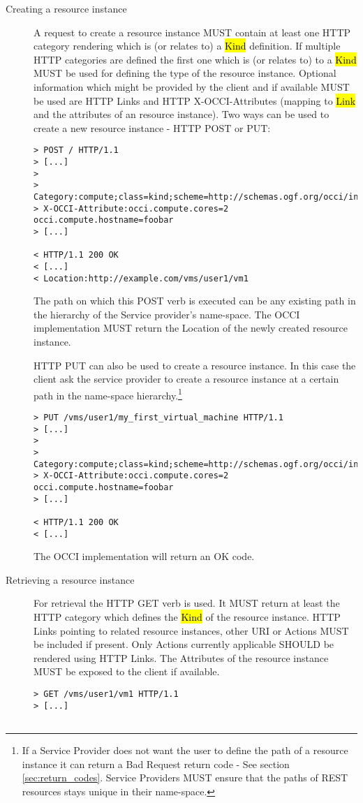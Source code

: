 \documentclass[10pt,a4paper]{article}
\begin{document}
\begin{description}
\item[Creating a resource instance] A request to create a resource
  instance MUST contain at least one HTTP category rendering which is
  (or relates to) a \hl{Kind} definition. If multiple HTTP categories
  are defined the first one which is (or relates to) to a \hl{Kind}
  MUST be used for defining the type of the resource
  instance. Optional information which might be provided by the client
  and if available MUST be used are HTTP Links and HTTP
  X-OCCI-Attributes (mapping to \hl{Link} and the attributes of an
  resource instance). Two ways can be used to create a new resource
  instance - HTTP POST or PUT:
\begin{verbatim}
> POST / HTTP/1.1
> [...]
> 
> Category:compute;class=kind;scheme=http://schemas.ogf.org/occi/infrastructure#
> X-OCCI-Attribute:occi.compute.cores=2 occi.compute.hostname=foobar
> [...]
 
< HTTP/1.1 200 OK
< [...]
< Location:http://example.com/vms/user1/vm1
\end{verbatim}
  The path on which this POST verb is executed can be any existing
  path in the hierarchy of the Service provider's name-space. The OCCI
  implementation MUST return the Location of the newly created
  resource instance.

  HTTP PUT can also be used to create a resource instance. In this
  case the client ask the service provider to create a resource
  instance at a certain path in the name-space hierarchy.\footnote{If a
    Service Provider does not want the user to define the path of a
    resource instance it can return a Bad Request return code - See
    section \ref{sec:return_codes}. Service Providers MUST ensure that
    the paths of REST resources stays unique in their name-space.}
\begin{verbatim}
> PUT /vms/user1/my_first_virtual_machine HTTP/1.1
> [...]
> 
> Category:compute;class=kind;scheme=http://schemas.ogf.org/occi/infrastructure#
> X-OCCI-Attribute:occi.compute.cores=2 occi.compute.hostname=foobar
> [...]
 
< HTTP/1.1 200 OK
< [...]
\end{verbatim}
  The OCCI implementation will return an OK code.

\item[Retrieving a resource instance] For retrieval the HTTP GET verb
  is used. It MUST return at least the HTTP category which defines the
  \hl{Kind} of the resource instance. HTTP Links pointing to related
  resource instances, other URI or Actions MUST be included if
  present. Only Actions currently applicable SHOULD be rendered using
  HTTP Links. The Attributes of the resource instance MUST be exposed
  to the client if available.
\begin{verbatim}
> GET /vms/user1/vm1 HTTP/1.1
> [...]
 

\end{verbatim}
\end{description}
\end{document}
